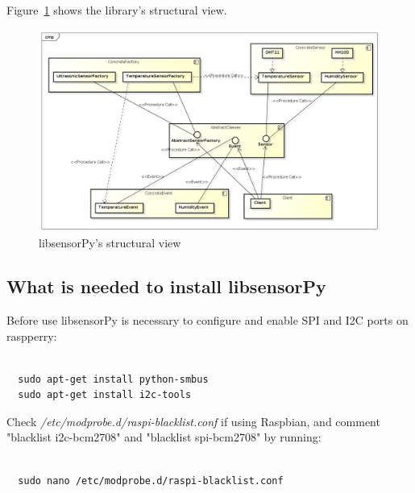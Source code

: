 \documentclass{acm_proc_article-sp}
\begin{document}
Figure~\ref{fig:view} shows the library's structural view.
\begin{figure}[ht]
\centering
    \includegraphics[width=1.0\textwidth,natwidth=610,natheight=642]{pictures/VisaoEstrutural.png}
    \caption{libsensorPy's structural view}
    \label{fig:view}
\end{figure}

\subsection{What is needed to install libsensorPy}
Before use libsensorPy is necessary to configure and enable SPI and I2C ports on raspperry:
\renewcommand{\theFancyVerbLine}{
  \sffamily\textcolor[rgb]{0.5,0.5,0.5}{\scriptsize\arabic{FancyVerbLine}}}
\begin{verbatim}

  sudo apt-get install python-smbus
  sudo apt-get install i2c-tools	

\end{verbatim}

Check \textit{/etc/modprobe.d/raspi-blacklist.conf} if using Raspbian, and comment "blacklist i2c-bcm2708" and "blacklist spi-bcm2708" by running:

\renewcommand{\theFancyVerbLine}{
  \sffamily\textcolor[rgb]{0.5,0.5,0.5}{\scriptsize\arabic{FancyVerbLine}}}
\begin{verbatim}

  sudo nano /etc/modprobe.d/raspi-blacklist.conf	

\end{verbatim}
\end{document}

